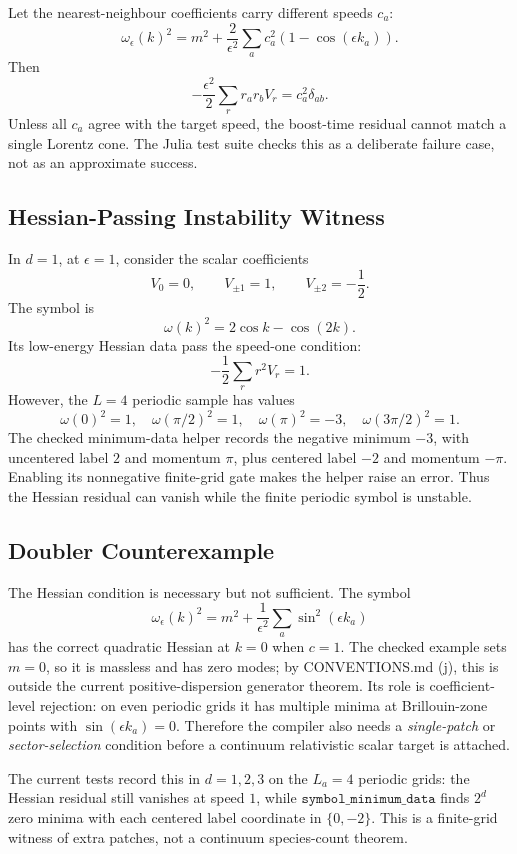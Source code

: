 Let the nearest-neighbour coefficients carry different speeds \(c_a\):
\[
  \omega_\epsilon(k)^2
  =
  m^2+\frac{2}{\epsilon^2}
  \sum_a c_a^2(1-\cos(\epsilon k_a)).
\]
Then
\[
  -\frac{\epsilon^2}{2}\sum_r r_ar_bV_r
  =
  c_a^2\delta_{ab}.
\]
Unless all \(c_a\) agree with the target speed, the boost-time residual cannot
match a single Lorentz cone.  The Julia test suite checks this as a deliberate
failure case, not as an approximate success.

\subsection{Hessian-Passing Instability Witness}

In \(d=1\), at \(\epsilon=1\), consider the scalar coefficients
\[
  V_0=0,\qquad V_{\pm 1}=1,\qquad V_{\pm 2}=-\frac12 .
\]
The symbol is
\[
  \omega(k)^2=2\cos k-\cos(2k).
\]
Its low-energy Hessian data pass the speed-one condition:
\[
  -\frac12\sum_r r^2V_r=1.
\]
However, the \(L=4\) periodic sample has values
\[
  \omega(0)^2=1,\quad
  \omega(\pi/2)^2=1,\quad
  \omega(\pi)^2=-3,\quad
  \omega(3\pi/2)^2=1.
\]
The checked minimum-data helper records the negative minimum \(-3\), with
uncentered label \(2\) and momentum \(\pi\), plus centered label \(-2\) and
momentum \(-\pi\).  Enabling its nonnegative finite-grid gate makes the helper
raise an error.  Thus the Hessian residual can vanish while the finite periodic
symbol is unstable.

\subsection{Doubler Counterexample}

The Hessian condition is necessary but not sufficient.  The symbol
\[
  \omega_\epsilon(k)^2
  =
  m^2+\frac{1}{\epsilon^2}\sum_a\sin^2(\epsilon k_a)
\]
has the correct quadratic Hessian at \(k=0\) when \(c=1\).  The checked example
sets \(m=0\), so it is massless and has zero modes; by CONVENTIONS.md (j), this
is outside the current positive-dispersion generator theorem.  Its role is
coefficient-level rejection: on even periodic grids it has multiple minima at
Brillouin-zone points with \(\sin(\epsilon k_a)=0\).  Therefore the compiler also
needs a \emph{single-patch} or \emph{sector-selection} condition before a
continuum relativistic scalar target is attached.

The current tests record this in \(d=1,2,3\) on the \(L_a=4\) periodic grids:
the Hessian residual still vanishes at speed \(1\), while
\(\texttt{symbol\_minimum\_data}\) finds \(2^d\) zero minima with each centered
label coordinate in \(\{0,-2\}\).  This is a finite-grid witness of extra
patches, not a continuum species-count theorem.

